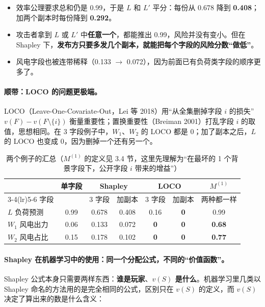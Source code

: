 \documentclass[zihao=-4,a4paper]{ctexart}
\begin{document}
\begin{itemize}[leftmargin=*]
  \item 效率公理要求总和仍是 0.99，于是 $L$ 和 $L'$ 平分：每份从 0.678 降到 \textbf{0.408}；加两个副本时每份降到 \textbf{0.292}。
  \item 攻击者拿到 $L$ 或 $L'$ 中\textbf{任意一个}，都能推出 0.99，风险并没有变小。但在 Shapley 下，\textbf{发布方只要多发几个副本，就能把每个字段的风险分数“做低”}。
  \item 风电字段也被连带稀释（0.133 $\to$ 0.072），因为前面已有负荷类字段的顺序更多了。
\end{itemize}

\paragraph{顺带：LOCO 的问题更极端。}LOCO（Leave-One-Covariate-Out，Lei 等 2018\cite{lei2018}）用“从全集删掉字段 $i$ 的损失”$v(F)-v(F\setminus\{i\})$ 衡量重要性；置换重要性（Breiman 2001\cite{breiman2001}）打乱字段 $i$ 的取值，思想相同。在 3 字段例子中，$W_1$、$W_2$ 的 LOCO 都是 0；加了副本之后，$L$ 的 LOCO 也变成 0，因为删掉一个还有另一个。

\begin{table}[H]\centering
\caption{两个例子的汇总（$M^{(1)}$ 的定义见 3.4 节，这里先理解为“在最坏的 1 个背景字段下，公开字段 $i$ 带来的增益”）}
\small
\begin{tabular}{lcccccc}
\toprule
& 单字段 & \multicolumn{2}{c}{Shapley} & \multicolumn{2}{c}{LOCO} & $M^{(1)}$ \\
\cmidrule(lr){3-4}\cmidrule(lr){5-6}
字段 & & 3 字段 & 加副本 & 3 字段 & 加副本 & 两种都一样 \\
\midrule
$L$ 负荷预测 & 0.99 & 0.678 & 0.408 & 0.16 & \textbf{0} & 0.99 \\
$W_1$ 风电出力 & 0.06 & 0.133 & 0.072 & \textbf{0} & \textbf{0} & \textbf{0.68} \\
$W_2$ 风电占比 & 0.15 & 0.178 & 0.102 & \textbf{0} & \textbf{0} & \textbf{0.77} \\
\bottomrule
\end{tabular}
\end{table}

\paragraph{Shapley 在机器学习中的使用：同一个分配公式，不同的“价值函数”。}Shapley 公式本身只需要两样东西：\textbf{谁是玩家}、\textbf{$v(S)$ 是什么}。机器学习里几类以 Shapley 命名的方法用的是完全相同的公式，区别只在 $v(S)$ 的定义，而 $v(S)$ 决定了算出来的数是什么含义：
\end{document}
